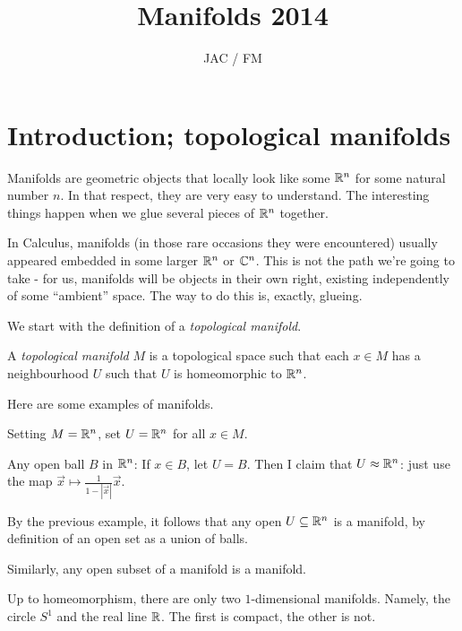 \documentclass[11pt, english]{article}
\title{Manifolds 2014}
\author{JAC / FM}
\date{}
\begin{document}
\maketitle
\tableofcontents 
\section{Introduction; topological manifolds}

Manifolds are geometric objects that locally look like some $\mathbb{R}^n$ for some natural number $n$. In that respect, they are very easy to understand. The interesting things happen when we glue several pieces of $\mathbb{R}^n$ together.

In Calculus, manifolds (in those rare occasions they were encountered) usually appeared embedded in some larger $\mathbb{R}^n$ or $\mathbb{C}^n$. This is not the path we're going to take - for us, manifolds will be objects in their own right, existing independently of some ``ambient'' space. The way to do this is, exactly, glueing.

We start with the definition of a \emph{topological manifold}.

\begin{defi}
A \emph{topological manifold} $M$ is a topological space such that each $x \in M$ has a neighbourhood $U$ such that $U$ is homeomorphic to $\mathbb{R}^n$.
\end{defi}

Here are some examples of manifolds.

\begin{example}
Setting $M=\mathbb{R}^n$, set $U=\mathbb{R}^n$ for all $x \in M$.
\end{example}

\begin{example}
Any open ball $B$ in $\mathbb{R}^n$: If $x \in B$, let $U=B$. Then I claim that $U \approx \mathbb{R}^n$: just use the map $\vec x \mapsto \frac{1}{1-|\vec x |} \vec x$.
\end{example}

\begin{example}
By the previous example, it follows that any open $U \subseteq \mathbb{R}^n$ is a manifold, by definition of an open set as a union of balls.
\end{example}

\begin{example}
Similarly, any open subset of a manifold is a manifold.
\end{example}

\begin{example}
Up to homeomorphism, there are only two $1$-dimensional manifolds. Namely, the circle $S^1$ and the real line $\mathbb{R}$. The first is compact, the other is not.
\end{example}
\end{document}
